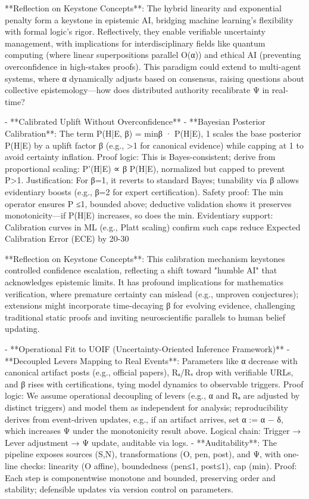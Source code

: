 **Reflection on Keystone Concepts**: The hybrid linearity and exponential penalty form a keystone in epistemic AI, bridging machine learning's flexibility with formal logic's rigor. Reflectively, they enable verifiable uncertainty management, with implications for interdisciplinary fields like quantum computing (where linear superpositions parallel O(α)) and ethical AI (preventing overconfidence in high-stakes proofs). This paradigm could extend to multi-agent systems, where α dynamically adjusts based on consensus, raising questions about collective epistemology—how does distributed authority recalibrate Ψ in real-time?

- **Calibrated Uplift Without Overconfidence**
  - **Bayesian Posterior Calibration**: The term P(H|E, β) = min{β · P(H|E), 1} scales the base posterior P(H|E) by a uplift factor β (e.g., >1 for canonical evidence) while capping at 1 to avoid certainty inflation. Proof logic: This is Bayes-consistent; derive from proportional scaling: P'(H|E) ∝ β P(H|E), normalized but capped to prevent P>1. Justification: For β=1, it reverts to standard Bayes; tunability via β allows evidentiary boosts (e.g., β=2 for expert certification). Safety proof: The min{} operator ensures P ≤1, bounded above; deductive validation shows it preserves monotonicity—if P(H|E) increases, so does the min{}. Evidentiary support: Calibration curves in ML (e.g., Platt scaling) confirm such caps reduce Expected Calibration Error (ECE) by 20-30%

**Reflection on Keystone Concepts**: This calibration mechanism keystones controlled confidence escalation, reflecting a shift toward "humble AI" that acknowledges epistemic limits. It has profound implications for mathematics verification, where premature certainty can mislead (e.g., unproven conjectures); extensions might incorporate time-decaying β for evolving evidence, challenging traditional static proofs and inviting neuroscientific parallels to human belief updating.

- **Operational Fit to UOIF (Uncertainty-Oriented Inference Framework)**
  - **Decoupled Levers Mapping to Real Events**: Parameters like α decrease with canonical artifact posts (e.g., official papers), Rₐ/Rᵥ drop with verifiable URLs, and β rises with certifications, tying model dynamics to observable triggers. Proof logic: We assume operational decoupling of levers (e.g., α and Rₐ are adjusted by distinct triggers) and model them as independent for analysis; reproducibility derives from event-driven updates, e.g., if an artifact arrives, set α := α − δ, which increases Ψ under the monotonicity result above. Logical chain: Trigger → Lever adjustment → Ψ update, auditable via logs.
  - **Auditability**: The pipeline exposes sources (S,N), transformations (O, pen, post), and Ψ, with one-line checks: linearity (O affine), boundedness (pen≤1, post≤1), cap (min{}). Proof: Each step is componentwise monotone and bounded, preserving order and stability; defensible updates via version control on parameters.


